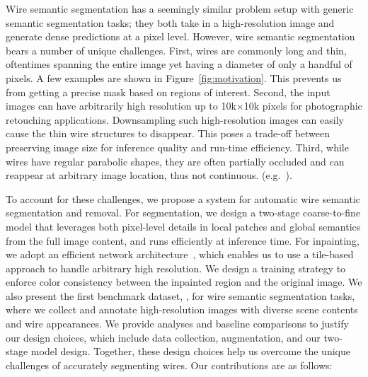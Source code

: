 Wire semantic segmentation has a seemingly similar problem setup with generic semantic segmentation tasks; they both take in a high-resolution image and generate dense predictions at a pixel level.
However, wire semantic segmentation bears a number of unique challenges. First, wires are commonly long and thin, oftentimes spanning the entire image yet having a diameter of only a handful of pixels. A few examples are shown in Figure~\ref{fig:motivation}. This prevents us from getting a precise mask based on regions of interest. Second, the input images can have arbitrarily high resolution up to 10k$\times$10k pixels for photographic retouching applications. Downsampling such high-resolution images can easily cause the thin wire structures to disappear. This poses a trade-off between preserving image size for inference quality and run-time efficiency.
Third, while wires have regular parabolic shapes, they are often partially occluded and can reappear at arbitrary image location, thus not continuous.
(e.g.~\cite{lanedet,swiftlane}).

To account for these challenges, we propose a system for automatic wire semantic segmentation and removal. For segmentation, we design a two-stage coarse-to-fine model that leverages both pixel-level details in local patches and global semantics from the full image content, and runs efficiently at inference time. For inpainting, we adopt an efficient network architecture~\cite{suvorov2022resolution}, which enables us to use a tile-based approach to handle arbitrary high resolution. We design a training strategy to enforce color consistency between the inpainted region and the original image.
We also present the first benchmark dataset, \benchmark, for wire semantic segmentation tasks, where we collect and annotate high-resolution images with diverse scene contents and wire appearances.
We provide analyses and baseline comparisons to justify our design choices, which include data collection, augmentation, and our two-stage model design. Together, these design choices help us overcome the unique challenges of accurately segmenting wires.
Our contributions are as follows: 

